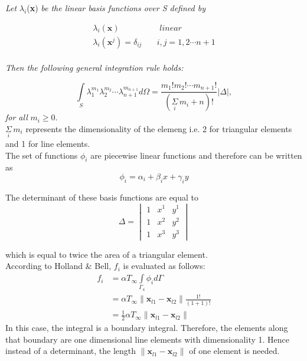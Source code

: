 \documentclass[10pt,a4paper]{article}
\begin{document}
\textit{Let} $\lambda_i$(\textbf{x}) \textit{be the linear basis functions over S defined by}

\begin{equation*}
\begin{split}
\lambda_i(\textbf{x}) \quad& \textit{ linear}\\
\lambda_i(\textbf{x}^j)=\delta_{ij} \quad& i,j=1,2\cdots n+1
\end{split}
\end{equation*}
\\
\textit{Then the following general integration rule holds:}

\begin{equation*}
\underset{S}{\int}\lambda^{m_1}_1\lambda^{m_2}_2\cdots \lambda^{m_{n+1}}_{n+1}d\Omega = \frac{m_1! m_2! \cdots m_{n+1}!}{\left(\underset{i}{\Sigma} \, m_i +n \right)! }\lvert \Delta \rvert,
\end{equation*}
\textit{for all} $m_i\geq 0$.\\

$\underset{i}{\Sigma} \, m_i$ represents the dimensionality of the elemeng i.e. 2 for triangular elements and 1 for line elements.\\

The set of functions $\phi_i $ are piecewise linear functions and therefore can be written as 
\begin{equation*}
\phi_i = \alpha_i + \beta_i x +  \gamma_i y
\end{equation*}

The determinant of these basis functions are equal to 
\begin{equation*}\label{eq:det2}
\Delta = \begin{vmatrix}
1		& x^1 		& y^1\\
1		& x^2 		& y^2\\
1		& x^3 		& y^3
\end{vmatrix}
\end{equation*}

which is equal to twice the area of a triangular element.\\


According to Holland \& Bell, $f_i$ is evaluated as follows:
\begin{align}\label{f}
f_i &=\alpha T_{\infty}\underset{\Gamma_4}{\int}  \phi_i d\Gamma \nonumber\\ 
    &= \alpha T_{\infty}\rVert\textbf{x}_{l1}-\textbf{x}_{l2}\rVert\frac{1!}{(1+1)!}\nonumber\\ 
    &=  \frac{1}{2} \alpha T_{\infty}\rVert\textbf{x}_{l1}-\textbf{x}_{l2}\rVert
\end{align}
In this case, the integral is a boundary integral. Therefore, the elements along that boundary are one dimensional line elements with dimensionality 1. Hence instead of a determinant, the length $\rVert\textbf{x}_{l1}-\textbf{x}_{l2}\rVert$ of one element is needed.\\
 
\end{document}
